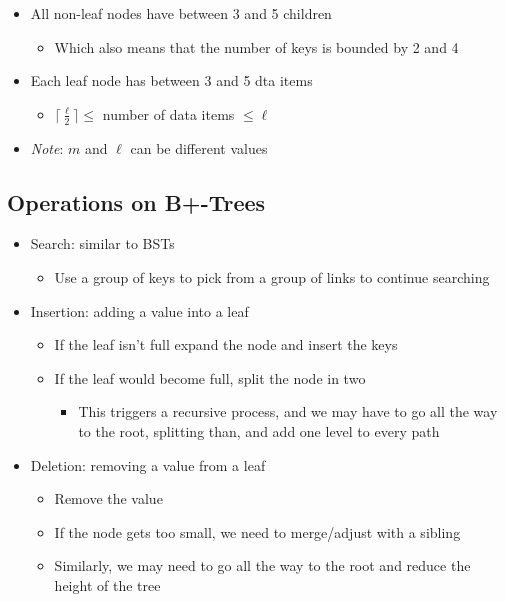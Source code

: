 \documentclass[
  10pt,
  english,
  letterpaper,
,tablecaptionabove
]{scrartcl}
\providecommand{\tightlist}{%
  \setlength{\itemsep}{0pt}\setlength{\parskip}{0pt}}
\begin{document}
\begin{itemize}
\tightlist
\item
  All non-leaf nodes have between 3 and 5 children

  \begin{itemize}
  \tightlist
  \item
    Which also means that the number of keys is bounded by 2 and 4
  \end{itemize}
\item
  Each leaf node has between 3 and 5 dta items

  \begin{itemize}
  \tightlist
  \item
    \(\lceil \frac{\ell}{2} \rceil \leq\) number of data items
    \(\leq \ell\)
  \end{itemize}
\item
  \emph{Note}: \(m\) and \(\ell\) can be different values
\end{itemize}

\hypertarget{operations-on-b-trees}{%
\subsection{Operations on B+-Trees}\label{operations-on-b-trees}}

\begin{itemize}
\tightlist
\item
  Search: similar to BSTs

  \begin{itemize}
  \tightlist
  \item
    Use a group of keys to pick from a group of links to continue
    searching
  \end{itemize}
\item
  Insertion: adding a value into a leaf

  \begin{itemize}
  \tightlist
  \item
    If the leaf isn't full expand the node and insert the keys
  \item
    If the leaf would become full, split the node in two

    \begin{itemize}
    \tightlist
    \item
      This triggers a recursive process, and we may have to go all the
      way to the root, splitting than, and add one level to every path
    \end{itemize}
  \end{itemize}
\item
  Deletion: removing a value from a leaf

  \begin{itemize}
  \tightlist
  \item
    Remove the value
  \item
    If the node gets too small, we need to merge/adjust with a sibling
  \item
    Similarly, we may need to go all the way to the root and reduce the
    height of the tree
  \end{itemize}
\end{itemize}
\end{document}
